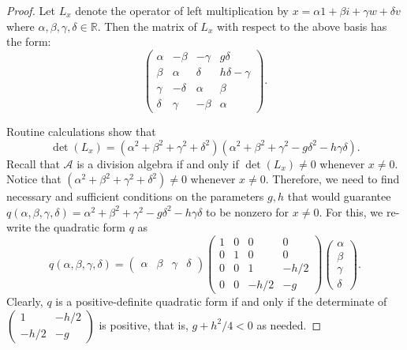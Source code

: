 \documentclass{amsart}
\theoremstyle{definition}
\theoremstyle{plain}
\begin{document}
\begin{proof}
Let $L_x$ denote the operator of left multiplication by $x=\alpha 1+\beta i+\gamma w+\delta v$ where $\alpha, \beta, \gamma, \delta \in \mathbb R$. Then the matrix of $L_x$ with respect to the above 
basis has the form: 
$$
\left( \begin{array}{cccc}
\alpha & -\beta & -\gamma & g\delta \\
\beta  & \alpha & \delta & h\delta - \gamma \\
\gamma & -\delta & \alpha & \beta \\
\delta & \gamma & -\beta & \alpha
\end{array}\right).$$

Routine calculations show that $$\det(L_x) = (\alpha^2 +\beta^2 + \gamma^2 + \delta^2) (\alpha^2 +\beta^2 +\gamma^2 -g\delta^2-h\gamma\delta).$$
Recall that $\mathcal A$ is a division algebra if and only if $\det(L_x)\neq 0$ whenever $x\neq 0$. Notice that $(\alpha^2 + \beta^2 +\gamma^2+\delta^2)\neq 0$ whenever $x\neq 0$.
Therefore, we need to find necessary and sufficient conditions on the parameters $g, h$ that would guarantee $q(\alpha, \beta, \gamma, \delta) = \alpha^2 +\beta^2 +\gamma^2 -g\delta^2-h\gamma\delta $ to be nonzero for $x\neq 0$.  
For this, we re-write the quadratic form $q$ as
$$ q(\alpha, \beta, \gamma, \delta) = \left(\begin{array}{cccc}\alpha&  \beta& \gamma& \delta\end{array}\right) 
\left( \begin{array}{cccc}
1&    0&    0&     0\\
0&    1&    0&     0\\
0&    0&    1&   -h/2 \\
0&    0&    -h/2 & -g
\end{array}\right)
\left(\begin{array}{c}
\alpha\\
\beta\\
\gamma\\
\delta
\end{array}\right).
$$
Clearly, $q$ is a positive-definite quadratic form if and only if the determinate of  $\left(\begin{array}{cc}
                                                                                                                                    1& -h/2\\
                                                                                                                                 -h/2 & -g
                                                                                                                                \end{array}\right)$ is positive, that is, $g+h^2/4 < 0$ as needed.
        \end{proof} 
\par\medskip
\end{document}
